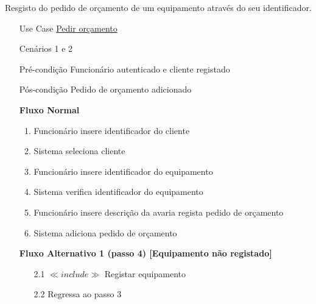 \documentclass[../relatorio.tex]{subfiles}
\begin{document}
Resgisto do pedido de orçamento de um equipamento através do seu identificador.
\begin{itemize}
	\item[Use Case] {\underline{Pedir orçamento}}
	\item[Cenários] {1 e 2}
	\item[Pré-condição] {Funcionário autenticado e cliente registado}
	\item[Pós-condição] {Pedido de orçamento adicionado}
	      \begin{flushleft}
		      \textbf{Fluxo Normal}
	      \end{flushleft}
	      \begin{enumerate}
		      \item Funcionário insere identificador do cliente
              \item Sistema seleciona cliente
		      \item Funcionário insere identificador do equipamento
		      \item Sistema verifica identificador do equipamento
		      \item Funcionário insere descrição da avaria regista pedido de orçamento
		      \item Sistema adiciona pedido de orçamento
	      \end{enumerate}

	      \begin{flushleft}
		      \textbf{Fluxo Alternativo 1 (passo 4) [Equipamento não registado]}
	      \end{flushleft}
	      \begin{itemize}
		      \item[2.1] $\ll include \gg$ Registar equipamento
		      \item[2.2] Regressa ao passo 3
	      \end{itemize}
\end{itemize}
\end{document}

